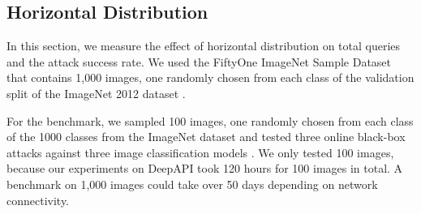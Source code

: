 


\subsection{Horizontal Distribution}

In this section, we measure the effect of horizontal distribution on total queries and the attack success rate. We used the FiftyOne ImageNet Sample Dataset that contains 1,000 images, one randomly chosen from each class of the validation split of the ImageNet 2012 dataset \cite{moore2020fiftyone}.

For the benchmark, we sampled 100 images, one randomly chosen from each class of the 1000 classes from the ImageNet dataset and tested three online black-box attacks against three image classification models \cite{chollet2015keras}. We only tested 100 images,  because our experiments on DeepAPI took 120 hours for 100 images in total. A benchmark on 1,000 images could take over 50 days depending on network connectivity.



